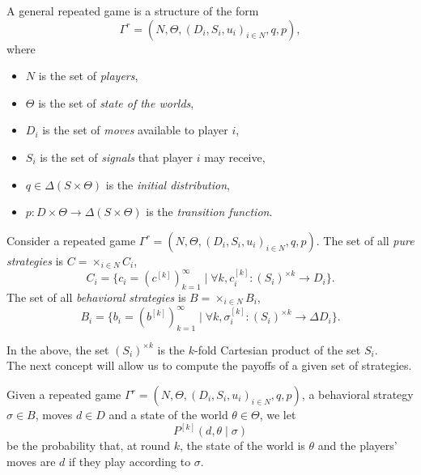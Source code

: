 \begin{definition}
A general repeated game is a structure of the form
$$\Gamma^r = (N, \Theta, (D_i, S_i, u_i)_{i \in N}, q, p), $$
where
\begin{itemize}
\item $N$ is the set of \emph{players},
\item $\Theta$ is the set of \emph{state of the worlds},
\item $D_i$ is the set of \emph{moves} available to player $i$,
\item $S_i$ is the set of \emph{signals} that player $i$ may receive,
\item $q \in \Delta(S \times \Theta)$ is the \emph{initial distribution},
\item $p : D \times \Theta \rightarrow \Delta(S \times \Theta) $ is the \emph{transition function}.
\end{itemize}
\end{definition}

\begin{definition}[Strategy]
Consider a repeated game $\Gamma^r = (N, \Theta, (D_i, S_i, u_i)_{i \in N}, q, p).$
The set of all \emph{pure strategies} is $C = \times_{i \in N} C_i$,
$$C_i = \{ c_i = (c^{[k]})_{k = 1}^{\infty} \mid \forall k , c_i^{[k]} : (S_i)^{\times k} \rightarrow D_i\}. $$
The set of all \emph{behavioral strategies} is $B = \times_{i \in N} B_i$,
$$B_i = \{ b_i = (b^{[k]})_{k = 1}^{\infty} \mid \forall k , \sigma_i^{[k]} : (S_i)^{\times k} \rightarrow \Delta D_i\}. $$
\end{definition}
In the above, the set $(S_i)^{\times k}$ is the $k$-fold Cartesian product of the set $S_i$.\\
The next concept will allow us to compute the payoffs of a given set of strategies.
\begin{definition}
Given a repeated game $\Gamma^r = (N, \Theta, (D_i, S_i, u_i)_{i \in N}, q, p)$, a behavioral strategy $\sigma \in B$,
moves $d \in D$ and a state of the world $\theta \in \Theta$, we let
$$ P^{[k]}(d,\theta \mid \sigma)$$
be the probability that, at round $k$, the state of the world is $\theta$ and the players' moves are $d$ if they play according to $\sigma$.
\end{definition}

